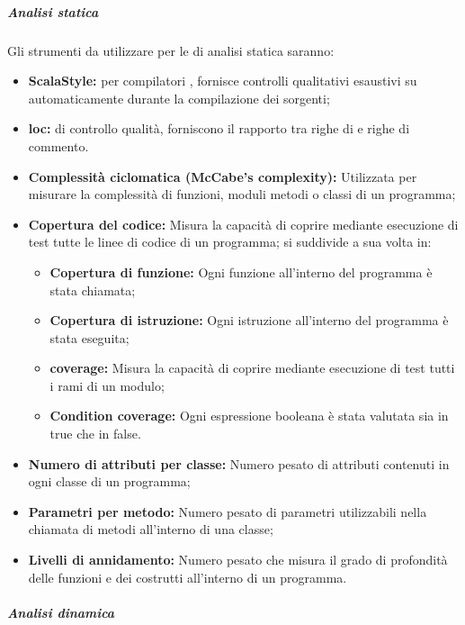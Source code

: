 \documentclass{scalatekids-article}
\begin{document}
\subparagraph{Analisi statica}

\label{sec:AnalisiStatica}
Gli strumenti da utilizzare per le  di analisi statica saranno:
\begin{itemize}
    \item\textbf{ScalaStyle:}  per compilatori , fornisce controlli qualitativi esaustivi su  automaticamente durante la compilazione dei sorgenti;
    \item\textbf{loc:}  di controllo qualità, forniscono il rapporto tra righe di  e righe di commento.
    \item\textbf{Complessità ciclomatica (McCabe's complexity):} Utilizzata per
        misurare la complessità di funzioni, moduli metodi o classi di un
        programma;
    \item\textbf{Copertura del codice:} Misura la capacità di coprire mediante
        esecuzione di test tutte le linee di codice di un programma; si
        suddivide a sua volta in:
        \begin{itemize}
            \item\textbf{Copertura di funzione:} Ogni funzione all'interno del
                programma è stata chiamata;
            \item\textbf{Copertura di istruzione:} Ogni istruzione all'interno
                del programma è stata eseguita;
            \item\textbf{ coverage:} Misura la capacità di coprire
                mediante esecuzione di test tutti i rami di un modulo;
            \item\textbf{Condition coverage:} Ogni espressione booleana è stata
                valutata sia in true che in false.
        \end{itemize}
    \item\textbf{Numero di attributi per classe:} Numero pesato di attributi
        contenuti in ogni classe di un programma;
    \item\textbf{Parametri per metodo:} Numero pesato di parametri utilizzabili
        nella chiamata di metodi all'interno di una classe;
    \item\textbf{Livelli di annidamento:} Numero pesato che misura il grado di
        profondità delle funzioni e dei costrutti all'interno di un programma.
\end{itemize}

\subparagraph{Analisi dinamica}
\end{document}
